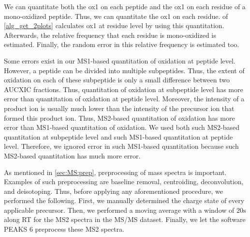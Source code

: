 We can quantitate both the \gls{ox1} on each peptide and the \gls{ox1} on each residue of a \gls{mono-oxidized} peptide.
Thus, we can quantitate the \gls{ox1} on each residue.
 of \cref{alg_get_2plots} 
		calculates \gls{ox1} at residue level by using this quantitation. 
Afterwards, the relative frequency that each residue is \gls{mono-oxidized} is estimated.
Finally, the random error in this relative frequency is estimated too. 

Some errors exist in our \gls{MS1}-based quantitation of oxidation at peptide level.
However, a peptide can be divided into multiple subpeptides.
Thus, the extent of oxidation on each of these subpeptide is only a small difference between two \gls{AUCXIC} fractions.
Thus, quantitation of oxidation at subpeptide level has more error than quantitation of oxidation at peptide level.
Moreover, the intensity of a product ion is usually much lower than the intensity of the precursor ion that formed this product ion.
Thus, \gls{MS2}-based quantitation of oxidation has more error than \gls{MS1}-based quantitation of oxidation.
We used both such \gls{MS2}-based quantitation at subpeptide level and such \gls{MS1}-based quantitation at peptide level.
Therefore, we ignored error in such \gls{MS1}-based quantitation because such \gls{MS2}-based quantitation has much more error.

As mentioned in \cref{sec:MS:prep}, preprocessing of mass spectra is important.
Examples of such preprocessing are baseline removal, centroiding, deconvolution, and deisotoping.
Thus,	before applying any aforementioned procedure, we performed the following.
First, we manually determined the charge state of every applicable precursor. 
Then, we performed a moving average with a window of \(20\si{\second}\) along \gls{RT} for the \gls{MS2} spectra in the \gls{MS/MS} dataset.
Finally, we let the software PEAKS 6 \cite{ma2003peaks} preprocess these \gls{MS2} spectra.	

